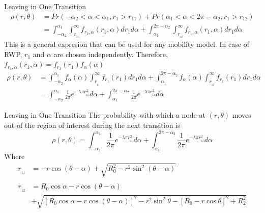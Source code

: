 \documentclass{beamer}
\begin{document}
\begin{frame}{Leaving in One Transition}{}
\begin{align*}
	\rho(r,\theta) &= Pr(-\alpha_2 < \alpha < \alpha_1,r_1 > r_{11}) + Pr(\alpha_1 < \alpha < 2\pi-\alpha_2, r_1 > r_{12}) \\
	&= \int_{-\alpha_2}^{\alpha_1} \int_{r_{\!_{11}}}^{\infty} f_{r_1,\alpha}(r_1,\alpha)dr_1 d\alpha +  \int^{2\pi-\alpha_2}_{\alpha_1} \int_{r_{\!_{12}}}^{\infty} f_{r_1,\alpha}(r_1,\alpha)dr_1 d\alpha 
\end{align*}
	This is a general expresion that can be used for any mobility model. In case of RWP,
	$r_1$ and $\alpha$ are chosen independently. Therefore, 
	$f_{r_1,\alpha}(r_1,\alpha) = f_{r_1}(r_1)f_{\alpha}(\alpha)$ 
\begin{align*}
	\rho(r,\theta)&= \int_{-\alpha_2}^{\alpha_1} f_{\alpha}(\alpha) \int_{r_{\!_{11}}}^{\infty} f_{r_1}(r_1)dr_1 d\alpha +  \int^{2\pi-\alpha_2}_{\alpha_1} f_{\alpha}(\alpha) \int_{r_{\!_{12}}}^{\infty} f_{r_1}(r_1)dr_1 d\alpha  \\
	&= \int_{-\alpha_2}^{\alpha_1} \frac{1}{2\pi} e^{-\lambda \pi r_{\!_{11}}^2} d\alpha +  \int^{2\pi-\alpha_2}_{\alpha_1} \frac{1}{2\pi} e^{-\lambda \pi r_{\!_{12}}^2} d\alpha
\end{align*}
\end{frame}



\begin{frame}{Leaving in One Transition} 
The probability with which a 
node at $(r,\theta)$ moves out of the region of interest during the next transition is 
\begin{equation*} 
	\rho(r,\theta) = \int_{-\alpha_2}^{\alpha_1} \frac{1}{2\pi} e^{-\lambda \pi r_{\!_{11}}^2} d\alpha +  \int^{2\pi-\alpha_2}_{\alpha_1} \frac{1}{2\pi} e^{-\lambda \pi r_{\!_{12}}^2} d\alpha
\end{equation*}
Where
\begin{align*}
	r_{\!_{11}} &= -r\cos(\theta -\alpha) + \sqrt{R_0^2 - r^2\sin^2(\theta - \alpha)} \\
	&\\
	r_{\!_{12}} &= R_0 \cos \alpha - r\cos(\theta - \alpha)  \\&+  \sqrt{[R_0 \cos \alpha - r\cos(\theta-\alpha) ]^2 - r^2\sin^2 \theta - [R_0 - r\cos \theta]^2 + R_2^2} \\
\end{align*}
\end{frame}
\end{document}
